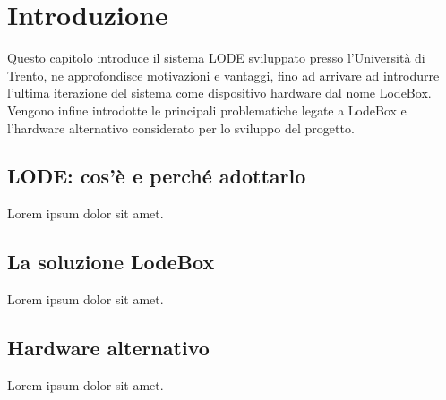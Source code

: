 \chapter{Introduzione}
\label{cha:intro}

Questo capitolo introduce il sistema LODE sviluppato presso l'Università di Trento, ne approfondisce motivazioni e vantaggi, fino ad arrivare ad introdurre l'ultima iterazione del sistema come dispositivo hardware dal nome LodeBox. Vengono infine introdotte le principali problematiche legate a LodeBox e l'hardware alternativo considerato per lo sviluppo del progetto.


\section{LODE: cos'è e perché adottarlo}
\label{sec:intro_lode}

Lorem ipsum dolor sit amet.

\section{La soluzione LodeBox}
\label{sec:intro_lodebox}

Lorem ipsum dolor sit amet.

\section{Hardware alternativo}
\label{sec:intro_hardware}

Lorem ipsum dolor sit amet.

